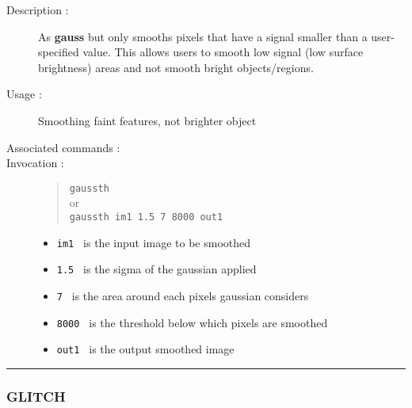 \begin{description}

\item[Description :] As {\bf gauss} but only smooths pixels that have a
signal smaller than a user-specified value.  This allows users to
smooth low signal (low surface brightness) areas and not smooth bright
objects/regions.

\item[Usage :] Smoothing faint features, not brighter object
\item[Associated commands :] {\tt {}}
\item[Invocation :]

\begin{quote}{\tt  gaussth }\\
or \\
{\tt gaussth im1 1.5 7 8000 out1 }
\end{quote}

\begin{itemize}

\item {\tt im1 } is the input image to be smoothed
\item {\tt 1.5 } is the sigma of the gaussian applied
\item {\tt 7 } is the area around each pixels gaussian considers
\item {\tt 8000 } is the threshold below which pixels are smoothed
\item {\tt out1 } is the output smoothed image
\end{itemize}\end{description}

\hrule
\subsubsection*{\label{GLITCH}GLITCH}

